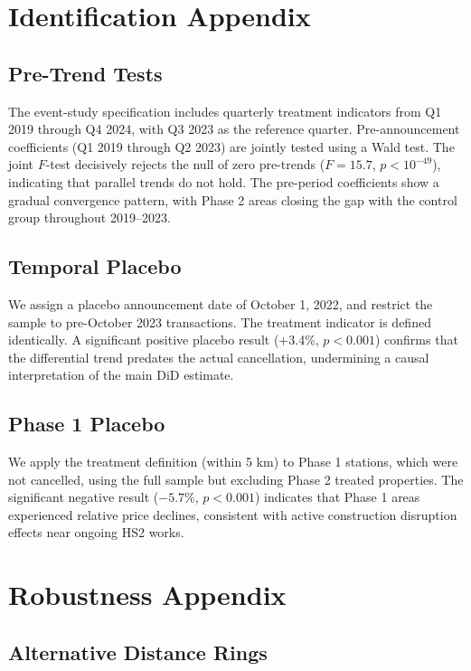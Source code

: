 \documentclass[12pt]{article}
\begin{document}
\section{Identification Appendix}

\subsection{Pre-Trend Tests}

The event-study specification includes quarterly treatment indicators from Q1 2019 through Q4 2024, with Q3 2023 as the reference quarter. Pre-announcement coefficients (Q1 2019 through Q2 2023) are jointly tested using a Wald test. The joint $F$-test decisively rejects the null of zero pre-trends ($F = 15.7$, $p < 10^{-49}$), indicating that parallel trends do not hold. The pre-period coefficients show a gradual convergence pattern, with Phase 2 areas closing the gap with the control group throughout 2019--2023.

\subsection{Temporal Placebo}

We assign a placebo announcement date of October 1, 2022, and restrict the sample to pre-October 2023 transactions. The treatment indicator is defined identically. A significant positive placebo result (+3.4\%, $p < 0.001$) confirms that the differential trend predates the actual cancellation, undermining a causal interpretation of the main DiD estimate.

\subsection{Phase 1 Placebo}

We apply the treatment definition (within 5 km) to Phase 1 stations, which were not cancelled, using the full sample but excluding Phase 2 treated properties. The significant negative result ($-5.7\%$, $p < 0.001$) indicates that Phase 1 areas experienced relative price declines, consistent with active construction disruption effects near ongoing HS2 works.

\section{Robustness Appendix}

\subsection{Alternative Distance Rings}
\end{document}
